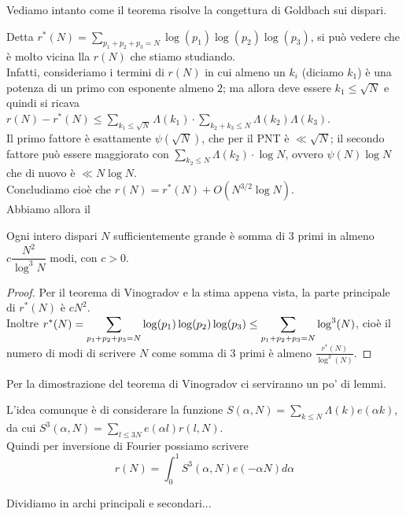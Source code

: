 Vediamo intanto come il teorema risolve la congettura di Goldbach sui dispari.

Detta $r^\ast(N)=\sum_{p_1+p_2+p_3=N}\log(p_1)\log(p_2)\log(p_3)$, si può vedere che è molto vicina lla $r(N)$ che stiamo studiando.\\
Infatti, consideriamo i termini di $r(N)$ in cui almeno un $k_i$ (diciamo $k_1$) è una potenza di un primo con esponente almeno $2$; ma allora deve essere $k_1\le\sqrt{N}$ e quindi si ricava $r(N)-r^\ast(N)\le \sum_{k_1\le\sqrt{N}}\Lambda(k_1)\cdot \sum_{k_2+k_3\le N}\Lambda(k_2)\Lambda(k_3)$.\\
Il primo fattore è esattamente $\psi(\sqrt{N})$, che per il PNT è $\ll\sqrt N$; il secondo fattore può essere maggiorato con $\sum_{k_2\le N}\Lambda(k_2)\cdot\log N$, ovvero $\psi(N)\log N$ che di nuovo è $\ll N\log N$.\\
Concludiamo cioè che $r(N)=r^\ast(N)+O(N^{3/2}\log N)$.\\
Abbiamo allora il
\begin{corollary}
    Ogni intero dispari $N$ sufficientemente grande è somma di $3$ primi in almeno $c\dfrac{N^2}{\log^3N}$ modi, con $c>0$.
\end{corollary}
\begin{proof}
    Per il teorema di Vinogradov e la stima appena vista, la parte principale di $r^\ast(N)$ è $c N^2$.\\
    Inoltre $\displaystyle r^\ast(N)=\sum_{p_1+p_2+p_3=N}\log(p_1)\log(p_2)\log(p_3) \le \sum_{p_1+p_2+p_3=N}\log^3(N)$, cioè il numero di modi di scrivere $N$ come somma di $3$ primi è almeno $\frac{r^\ast(N)}{\log^3(N)}$.
\end{proof}

Per la dimostrazione del teorema di Vinogradov ci serviranno un po' di lemmi.

L'idea comunque è di considerare la funzione $S(\alpha,N)=\sum_{k\le N}\Lambda(k)e(\alpha k)$, da cui $S^3(\alpha,N)=\sum_{l\le 3N}e(\alpha l) r(l,N)$.\\
Quindi per inversione di Fourier possiamo scrivere
$$ r(N)=\int_{0}^{1}S^3(\alpha,N)e(-\alpha N)d\alpha $$

Dividiamo in archi principali e secondari...



